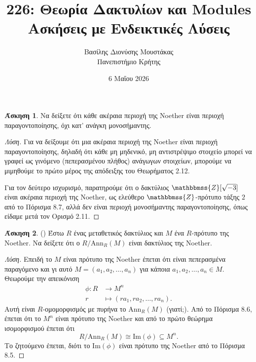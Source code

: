 \documentclass[12pt,a4paper,reqno]{amsart}
\title{226: Θεωρία Δακτυλίων και Modules \\ Ασκήσεις με Ενδεικτικές Λύσεις}
\author[Β.~Δ. Μουστακας]{Βασίλης Διονύσης Μουστάκας \\ Πανεπιστήμιο Κρήτης}
\date{6 Μαΐου 2026}
\theoremstyle{definition}
\newtheorem{exercise}{Άσκηση}
\newcommand{\ZZ}{\mathbbmss{Z}}
\renewcommand{\to}{\rightarrow}
\newcommand{\rmIm}{\mathrm{Im}}
\newcommand{\Ann}{\mathrm{Ann}}
\begin{document}
\begingroup
\def\uppercasenonmath#1{} %
\let\MakeUppercase\relax %
\maketitle
\endgroup

\setcounter{exercise}{37}
\setcounter{equation}{10}
\renewcommand{\thesubsection}{\thesection.\arabic{subsection}}

\begin{exercise}
  \label{ex:noetherian_domain}
  Να δείξετε ότι κάθε ακέραια περιοχή της Noether είναι περιοχή παραγοντο\-ποίησης, όχι κατ' ανάγκη μονοσήμαντης.
\end{exercise}

\begin{proof}[Λύση]
  Για να δείξουμε ότι μια ακέραια περιοχή της Noether είναι περιοχή παραγοντοποίη\-σης, δηλαδή ότι κάθε μη μηδενικό, μη αντιστρέψιμο στοιχείο μπορεί να γραφεί ως γινόμενο (πεπερασμένου πλήθος) ανάγωγων στοιχείων, μπορούμε να μιμηθούμε το πρώτο μέρος της απόδειξης του Θεωρήματος 2.12.

  Για τον δεύτερο ισχυρισμό, παρατηρούμε ότι ο δακτύλιος $\ZZ[\sqrt{-3}]$ είναι ακέραια περιοχή της Noether, ως ελεύθερο $\ZZ$-πρότυπο τάξης $2$ από το Πόρισμα 8.7, αλλά δεν είναι περιοχή μονοσήμαντης παραγοντοποίησης, όπως είδαμε μετά τον Ορισμό 2.11.
\end{proof}

\begin{exercise}{\rm(\cite[Άσκηση~5.3]{Mal08})}
  \label{ex:mal_5.3}
  Έστω $R$ ένας μεταθετικός δακτύλιος και $M$ ένα $R$-πρότυπο της Noether. Να δείξετε ότι ο $R/\Ann_R(M)$ είναι δακτύλιος της Noether.
\end{exercise}

\begin{proof}[Λύση]
  Επειδή το $M$ είναι πρότυπο της Noether έπεται ότι είναι πεπερασμένα παραγόμενο και γι αυτό $M = \left(
    a_1, a_2, \dots, a_n
  \right)$ για κάποια $a_1, a_2, \dots, a_n \in M$. Θεωρούμε την απεικόνιση 
  \begin{align*}
    \phi : R &\to M^n \\
    r &\mapsto (ra_1, ra_2, \dots, ra_n).
  \end{align*}
  Αυτή είναι $R$-ομομορφισμός με πυρήνα το $\Ann_R(M)$ (γιατί;). Από το Πόρισμα 8.6, έπεται ότι το $M^n$ είναι πρότυπο της Noether και από το πρώτο θεώρημα ισομορφισμού έπεται ότι 
  \[
  R/\Ann_R(M) \cong \rmIm(\phi) \subseteq M^n.
  \]
  Το ζητούμενο έπεται, διότι το $\rmIm(\phi)$ είναι πρότυπο της Noether από το Πόρισμα 8.5.
\end{proof}
\end{document}
